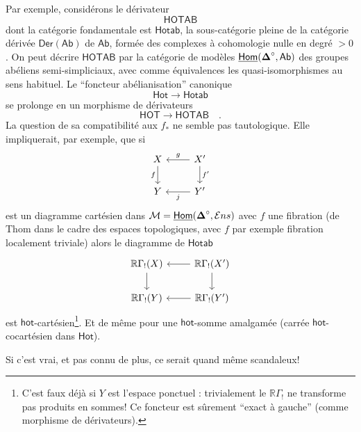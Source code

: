 \noindent{}Par exemple, considérons le dérivateur
\[
\mathsf{HOTAB}
\]
dont la catégorie fondamentale est $\mathsf{Hotab}$, la sous-catégorie pleine de la catégorie dérivée $\mathsf{Der}(\mathsf{Ab})$ de $\mathsf{Ab}$, formée des complexes à cohomologie nulle en degré $> 0$. On peut décrire $\mathsf{HOTAB}$ par la catégorie de modèles $\underline{\mathsf{Hom}}(\boldsymbol{\Delta}^\circ,\mathsf{Ab})$ des groupes abéliens semi-simpliciaux, avec comme équivalences les quasi-isomorphismes au sens habituel. Le “foncteur abélianisation” canonique
\[
\mathsf{Hot} \longrightarrow \mathsf{Hotab}
\]
se prolonge en un morphisme de dérivateurs
\[
\mathsf{HOT} \longrightarrow \mathsf{HOTAB} \quad .
\]
La question de sa compatibilité aux $f_*$ ne semble pas tautologique. Elle impliquerait, par exemple, que si
\[
\begin{tikzcd}
X \arrow[d, "f"'] & X' \arrow[l, "g"'] \arrow[d, "f'"] \\
Y & Y' \arrow[l, "j"]
\end{tikzcd}
\]
est un diagramme cartésien dans $\mathcal{M} = \underline{\mathsf{Hom}}(\boldsymbol{\Delta}^\circ,\mathcal{E}ns)$ avec $f$ une fibration (de Thom dans le cadre des espaces topologiques, avec $f$ par exemple fibration localement triviale) alors le diagramme de $\mathsf{Hotab}$
\[
\begin{tikzcd}
\mathbb{R}\Gamma_!(X) \arrow[d] & \mathbb{R}\Gamma_!(X') \arrow[l] \arrow[d] \\
\mathbb{R}\Gamma_!(Y) & \mathbb{R}\Gamma_!(Y') \arrow[l]
\end{tikzcd}
\]
est $\mathsf{hot}$-cartésien\footnote[7]{C’est faux déjà si $Y$ est l’espace ponctuel : trivialement le $\mathbb{R}\Gamma_!$ ne transforme pas produits en sommes! Ce foncteur est sûrement “exact à gauche” (comme morphisme de dérivateurs).}. Et de même pour une $\mathsf{hot}$-somme amalgamée (carrée $\mathsf{hot}$-cocartésien dans $\mathsf{Hot}$). %

\noindent{}Si c’est vrai, et pas connu de plus, ce serait quand même scandaleux!

